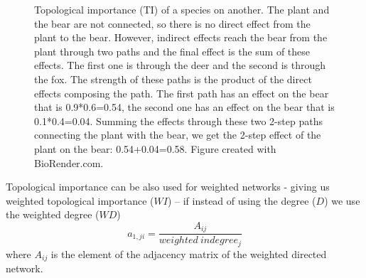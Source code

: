 \documentclass[twocolumn]{article}
\begin{document}
\begin{enumerate}
\begin{figure}[htbp]
				      \caption{Topological importance (TI) of a species on another. The plant and the bear are not connected, so there is no direct effect from the plant to the bear. However, indirect effects reach the bear from the plant through two paths and the final effect is the sum of these effects. The first one is through the deer and the second is through the fox. The strength of these paths is the product of the direct effects composing the path. The first path has an effect on the bear that is 0.9*0.6=0.54, the second one has an effect on the bear that is 0.1*0.4=0.04. Summing the effects through these two 2-step paths connecting the plant with the bear, we get the 2-step effect of the plant on the bear: 0.54+0.04=0.58. Figure created with BioRender.com.}    \label{fig:TI}
			      \end{figure}
		\end{enumerate}
		\par
		Topological importance can be also used for weighted networks - giving us weighted topological importance ($WI$) – if instead of using the degree ($D$) we use the weighted degree ($WD$) \citep{Scotti2007} \begin{equation} a_{1,ji}=\frac{A_{ij}}{weighted\:indegree_j} \end{equation} where $A_{ij}$ is the element of the adjacency matrix of the weighted directed network.
\end{document}
